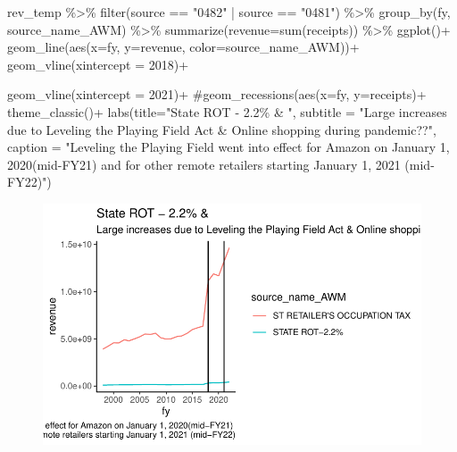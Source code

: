 \documentclass[
  letterpaper,
  DIV=11,
  numbers=noendperiod]{scrreport}
\newenvironment{Shaded}{\begin{snugshade}}{\end{snugshade}}
\newcommand{\AttributeTok}[1]{\textcolor[rgb]{0.40,0.45,0.13}{#1}}
\newcommand{\CommentTok}[1]{\textcolor[rgb]{0.37,0.37,0.37}{#1}}
\newcommand{\DecValTok}[1]{\textcolor[rgb]{0.68,0.00,0.00}{#1}}
\newcommand{\FunctionTok}[1]{\textcolor[rgb]{0.28,0.35,0.67}{#1}}
\newcommand{\NormalTok}[1]{\textcolor[rgb]{0.00,0.23,0.31}{#1}}
\newcommand{\SpecialCharTok}[1]{\textcolor[rgb]{0.37,0.37,0.37}{#1}}
\newcommand{\StringTok}[1]{\textcolor[rgb]{0.13,0.47,0.30}{#1}}
\begin{document}
\begin{Shaded}
\begin{Highlighting}[]
\NormalTok{rev\_temp }\SpecialCharTok{\%\textgreater{}\%} 
  \FunctionTok{filter}\NormalTok{(source }\SpecialCharTok{==} \StringTok{"0482"} \SpecialCharTok{|}\NormalTok{ source }\SpecialCharTok{==} \StringTok{"0481"}\NormalTok{) }\SpecialCharTok{\%\textgreater{}\%}
  \FunctionTok{group\_by}\NormalTok{(fy, source\_name\_AWM) }\SpecialCharTok{\%\textgreater{}\%} 
  \FunctionTok{summarize}\NormalTok{(}\AttributeTok{revenue=}\FunctionTok{sum}\NormalTok{(receipts))  }\SpecialCharTok{\%\textgreater{}\%} 
  \FunctionTok{ggplot}\NormalTok{()}\SpecialCharTok{+}
  \FunctionTok{geom\_line}\NormalTok{(}\FunctionTok{aes}\NormalTok{(}\AttributeTok{x=}\NormalTok{fy, }\AttributeTok{y=}\NormalTok{revenue, }\AttributeTok{color=}\NormalTok{source\_name\_AWM))}\SpecialCharTok{+}
  \FunctionTok{geom\_vline}\NormalTok{(}\AttributeTok{xintercept =} \DecValTok{2018}\NormalTok{)}\SpecialCharTok{+}

  \FunctionTok{geom\_vline}\NormalTok{(}\AttributeTok{xintercept =} \DecValTok{2021}\NormalTok{)}\SpecialCharTok{+}
  \CommentTok{\#geom\_recessions(aes(x=fy, y=receipts)+}
  \FunctionTok{theme\_classic}\NormalTok{()}\SpecialCharTok{+}
  \FunctionTok{labs}\NormalTok{(}\AttributeTok{title=}\StringTok{"State ROT {-} 2.2\% \& "}\NormalTok{,}
       \AttributeTok{subtitle =} \StringTok{"Large increases due to Leveling the Playing Field Act \& Online shopping during pandemic??"}\NormalTok{,}
       \AttributeTok{caption =} \StringTok{"Leveling the Playing Field went into effect for Amazon on January 1, 2020(mid{-}FY21) }
\StringTok{       and for other remote retailers starting January 1, 2021 (mid{-}FY22)"}\NormalTok{)}
\end{Highlighting}
\end{Shaded}

\begin{figure}[H]

{\centering \includegraphics{./Everything_files/figure-pdf/unnamed-chunk-13-4.pdf}

}

\end{figure}
\end{document}
